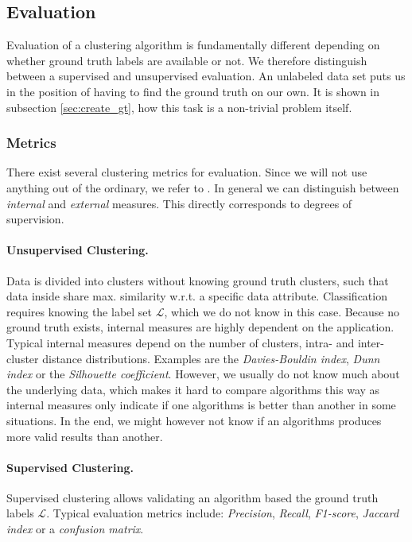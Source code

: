 \newpage
\subsection{Evaluation}
Evaluation of a clustering algorithm is fundamentally different depending on whether ground truth labels are available or not. We therefore distinguish between a supervised and unsupervised evaluation. An unlabeled data set puts us in the position of having to find the ground truth on our own. It is shown in subsection \ref{sec:create_gt}, how this task is a non-trivial problem itself. 

\subsubsection{Metrics}
There exist several clustering metrics for evaluation. Since we will not use anything out of the ordinary, we refer to \cite{aggarwal2015data}. In general we can distinguish between \textit{internal} and \textit{external} measures. This directly corresponds to degrees of supervision. 

\paragraph{Unsupervised Clustering.}
Data is divided into clusters without knowing ground truth clusters, such that data inside share max. similarity w.r.t. a specific data attribute. Classification requires knowing the label set $ \mathcal{L} $, which we do not know in this case. Because no ground truth exists, internal measures are highly dependent on the application. Typical internal measures depend on the number of clusters, intra- and inter-cluster distance distributions. Examples are the \textit{Davies-Bouldin index}, \textit{Dunn index} or the \textit{Silhouette coefficient}. However, we usually do not know much about the underlying data, which makes it hard to compare algorithms this way as internal measures only indicate if one algorithms is better than another in some situations. In the end, we might however not know if an algorithms produces more valid results than another.

\paragraph{Supervised Clustering.}
Supervised clustering allows validating an algorithm based the ground truth labels $ \mathcal{L} $. Typical evaluation metrics include: \textit{Precision}, \textit{Recall}, \textit{F1-score}, \textit{Jaccard index} or a \textit{confusion matrix}. 

